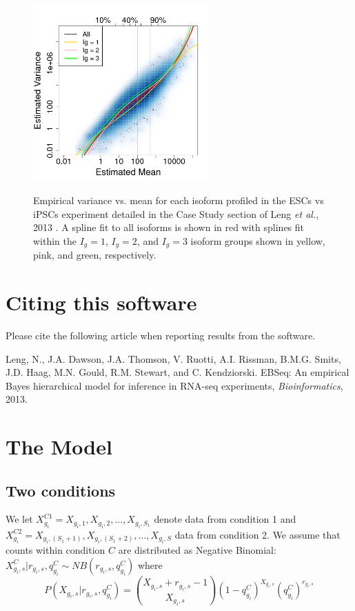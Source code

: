 \documentclass{article}
\begin{document}
\begin{figure}[t]
\centering
\includegraphics[width=0.6\textwidth]{PlotExample.png}
\label{fig:GouldNg}
\caption{Empirical variance vs. mean for
each isoform profiled in the ESCs vs iPSCs experiment detailed in
the Case Study section of Leng {\it et al.}, 2013 \cite{Leng13}.
A spline fit to all isoforms is shown in red with splines fit within the $I_g=1$, $I_g=2$, and $I_g=3$ isoform groups
shown in yellow, pink, and green, respectively.}
\end{figure}


\section{Citing this software}
\label{sec:cite}
Please cite the following article when reporting results from the software.

\noindent Leng, N., J.A. Dawson, J.A. Thomson, V. Ruotti, A.I. Rissman, 
B.M.G. Smits, J.D. Haag, M.N. Gould, R.M. Stewart, and C. Kendziorski. 
EBSeq: An empirical Bayes hierarchical model for inference in RNA-seq
experiments, {\it Bioinformatics}, 2013.

\section{The Model}
\label{sec:model}
\subsection{Two conditions}
\label{sec:twocondmodel}
We let $X_{g_i}^{C1} = X_{g_i,1} ,X_{g_i,2}, ...,X_{g_i,S_1}$ denote data from condition 1
and $ X_{g_i}^{C2} = X_{g_i,(S_1+1)},X_{g_i,(S_1+2)},...,X_{g_i,S}$ data from condition 2.
We assume that counts within condition $C$ are distributed as Negative Binomial: 
$X_{g_i,s}^C|r_{g_i,s}, q_{g_i}^C \sim NB(r_{g_i,s}, q_{g_i}^C)$ where
\begin{equation}
P(X_{g_i,s}|r_{g_i,s},q_{g_i}^C) = {X_{g_i,s}+r_{g_i,s}-1\choose X_{g_i,s}}(1-q_{g_i}^C)^{X_{g_i,s}}(q_{g_i}^C)^{r_{g_i,s}}\label{eq:01}
\end{equation}
\end{document}
